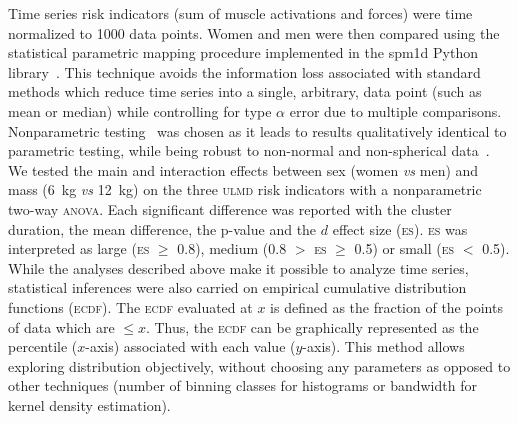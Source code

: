 Time series risk indicators (sum of muscle activations and forces) were time normalized to 1000 data points.
Women and men were then compared using the statistical parametric mapping procedure implemented in the spm1d Python library~\cite{Pataky2010-zh}.
This technique avoids the information loss associated with standard methods which reduce time series into a single, arbitrary, data point (such as mean or median) while controlling for type $\alpha$ error due to multiple comparisons.
Nonparametric testing~\cite{Nichols2002-ri} was chosen as it leads to results qualitatively identical to parametric testing, while being robust to non-normal and non-spherical data~\cite{Pataky2015-ss}.
We tested the main and interaction effects between sex (women \textit{vs} men) and mass (6~kg \textit{vs} 12~kg) on the three \textsc{ulmd} risk indicators with a nonparametric two-way \textsc{anova}.
Each significant difference was reported with the cluster duration, the mean difference, the p-value and the \citet{Cohen2013-tj} $d$ effect size (\textsc{es}).
\textsc{es} was interpreted as large (\textsc{es} $\geq$ 0.8), medium (0.8 $>$ \textsc{es} $\geq$ 0.5) or small (\textsc{es} $<$ 0.5).
While the analyses described above make it possible to analyze time series, statistical inferences were also carried on empirical cumulative distribution functions (\textsc{ecdf}).
The \textsc{ecdf} evaluated at $x$ is defined as the fraction of the points of data which are $\leq x$.
Thus, the \textsc{ecdf} can be graphically represented as the percentile ($x$-axis) associated with each value ($y$-axis).
This method allows exploring distribution objectively, without choosing any parameters as opposed to other techniques (number of binning classes for histograms or bandwidth for kernel density estimation).